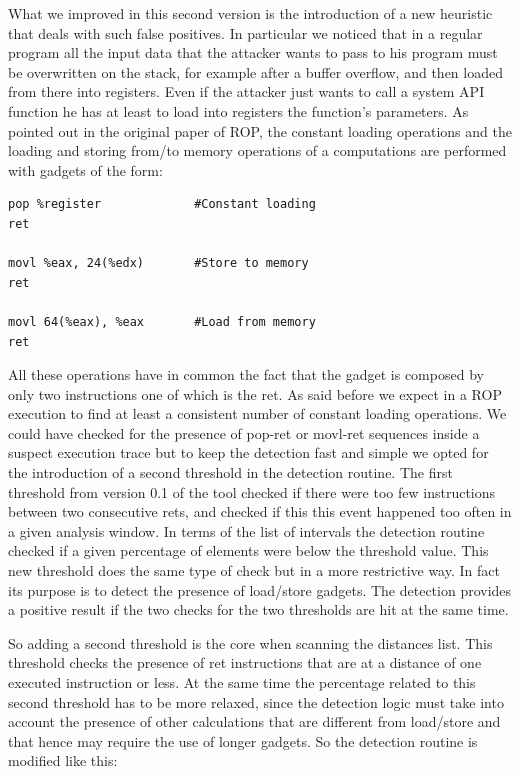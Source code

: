 \documentclass[Lau,binding=0.6cm]{sapthesis}
\begin{document}
What we improved in this second version is the introduction of a new heuristic that deals with such false positives. In particular we noticed that in a regular program all the input data that the attacker wants to pass to his program must be overwritten on the stack, for example after a buffer overflow, and then loaded from there into registers. Even if the attacker just wants to call a system API function he has at least to load into registers the function’s parameters. As pointed out in the original paper of ROP, the constant loading operations and the loading and storing from/to memory operations of a computations are performed with gadgets of the form:

\begin{lstlisting}[language={[x86masm]Assembler}]
pop %register             #Constant loading
ret

movl %eax, 24(%edx)       #Store to memory
ret

movl 64(%eax), %eax       #Load from memory
ret
\end{lstlisting}


All these operations have in common the fact that the gadget is composed by only two instructions one of which is the ret. 
As said before we expect in a ROP execution to find at least a consistent number of constant loading operations. We could have checked for the presence of pop-ret or movl-ret sequences inside a suspect execution trace but to keep the detection fast and simple we opted for the introduction of a second threshold in the detection routine. The first threshold from version 0.1 of the tool checked if there were too few instructions between two consecutive rets, and checked if this this event happened too often in a given analysis window. In terms of the list of intervals the detection routine checked if a given percentage of elements were below the threshold value.
This new threshold does the same type of check but in a more restrictive way. In fact its purpose is to detect the presence of load/store gadgets. The detection provides a positive result if the two checks for the two thresholds are hit at the same time.


So adding a second threshold is the core when scanning the distances list. This threshold checks the presence of ret instructions that are at a distance of one executed instruction or less. At the same time the percentage related to this second threshold has to be more relaxed, since the detection logic must take into account the presence of other calculations that are different from load/store and that hence may require the use of longer gadgets. So the detection routine is modified like this:
\end{document}
